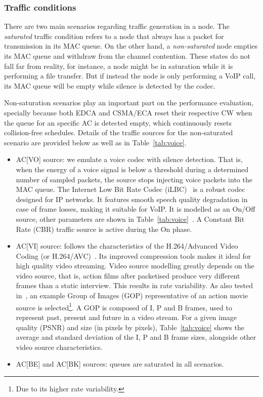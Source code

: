 \documentclass[a4paper]{article}
\begin{document}
\subsubsection{Traffic conditions}\label{traffic}
There are two main scenarios regarding traffic generation in a node. The \emph{saturated} traffic condition refers to a node that always has a packet for transmission in its MAC queue. On the other hand, a \emph{non-saturated} node empties its MAC queue and withdraw from the channel contention. These states do not fall far from reality, for instance, a node might be in saturation while it is performing a file transfer. But if instead the node is only performing a VoIP call, its MAC queue will be empty while silence is detected by the codec.

Non-saturation scenarios play an important part on the performance evaluation, specially because both EDCA and CSMA/ECA reset their respective CW when the queue for an specific AC is detected empty, which continuously resets collision-free schedules. Details of the traffic sources for the non-saturated scenario are provided below as well as in Table~\ref{tab:voice}.
	\begin{itemize}
		\item AC[VO] source: we emulate a voice codec with silence detection. That is, when the energy of a voice signal is below a threshold during a determined number of sampled packets, the source stops injecting voice packets into the MAC queue. The Internet Low Bit Rate Codec (iLBC)~\cite{andersen2004internet} is a robust codec designed for IP networks. It features smooth speech quality degradation in case of frame losses, making it suitable for VoIP. It is modelled as an On/Off source, other parameters are shown in Table~\ref{tab:voice}~\cite{menth2009source}. A Constant Bit Rate (CBR) traffic source is active during the On phase.
		
		\item AC[VI] source: follows the characteristics of the H.264/Advanced Video Coding (or H.264/AVC)~\cite{van2008traffic}. Its improved compression tools makes it ideal for high quality video streaming. Video source modelling greatly depends on the video source, that is, action films after packetised produce very different frames than a static interview. This results in rate variability. As also tested in~\cite{van2008traffic}, an example Group of Images (GOP) representative of an action movie source is selected\footnote{Due to its higher rate variability.}. A GOP is composed of I, P and B frames, used to represent past, present and future in a video stream. For a given image quality (PSNR) and size (in pixels by pixels), Table~\ref{tab:voice} shows the average and standard deviation of the I, P and B frame sizes, alongside other video source characteristics.
		
		\item AC[BE] and AC[BK] sources: queues are saturated in all scenarios.
	\end{itemize}
	
\end{document}
